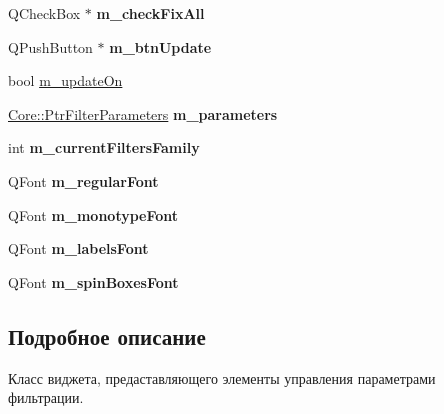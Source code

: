 \begin{DoxyCompactItemize}
\item 
\hypertarget{class_filter_parameters_widget_a0309087dfdcd0b9266fda00298aa8497}{}\label{class_filter_parameters_widget_a0309087dfdcd0b9266fda00298aa8497} 
Q\+Check\+Box $\ast$ {\bfseries m\+\_\+check\+Fix\+All}
\item 
\hypertarget{class_filter_parameters_widget_a1df61481716842b7b816a147590573f7}{}\label{class_filter_parameters_widget_a1df61481716842b7b816a147590573f7} 
Q\+Push\+Button $\ast$ {\bfseries m\+\_\+btn\+Update}
\item 
bool \hyperlink{class_filter_parameters_widget_a972435cbd7b57d2c3de2f933e7616c1c}{m\+\_\+update\+On}
\item 
\hypertarget{class_filter_parameters_widget_a55cf14ba922106b95c07267afb79d92a}{}\label{class_filter_parameters_widget_a55cf14ba922106b95c07267afb79d92a} 
\hyperlink{namespace_core_a4811af8148ba137d644b9a61a042cf03}{Core\+::\+Ptr\+Filter\+Parameters} {\bfseries m\+\_\+parameters}
\item 
\hypertarget{class_filter_parameters_widget_aae38cd16a6f26df5e66a3ff17e081695}{}\label{class_filter_parameters_widget_aae38cd16a6f26df5e66a3ff17e081695} 
int {\bfseries m\+\_\+current\+Filters\+Family}
\item 
\hypertarget{class_filter_parameters_widget_a9275e817244203bb801a4fdd7be409cf}{}\label{class_filter_parameters_widget_a9275e817244203bb801a4fdd7be409cf} 
Q\+Font {\bfseries m\+\_\+regular\+Font}
\item 
\hypertarget{class_filter_parameters_widget_a5b2a163e0343bc8005a1574bbe2904ad}{}\label{class_filter_parameters_widget_a5b2a163e0343bc8005a1574bbe2904ad} 
Q\+Font {\bfseries m\+\_\+monotype\+Font}
\item 
\hypertarget{class_filter_parameters_widget_a64b06f79e5dea28727141deacd44e9fb}{}\label{class_filter_parameters_widget_a64b06f79e5dea28727141deacd44e9fb} 
Q\+Font {\bfseries m\+\_\+labels\+Font}
\item 
\hypertarget{class_filter_parameters_widget_a008425a55ae4ad995ae6560e37479fee}{}\label{class_filter_parameters_widget_a008425a55ae4ad995ae6560e37479fee} 
Q\+Font {\bfseries m\+\_\+spin\+Boxes\+Font}
\end{DoxyCompactItemize}


\subsection{Подробное описание}
Класс виджета, предаставляющего элементы управления параметрами фильтрации. 

